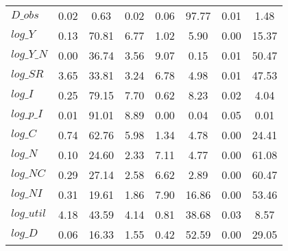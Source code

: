 \begin{center}
\begin{longtable}{lccccccc}
$D\_obs     $	 & 	        0.02	 & 	        0.63	 & 	        0.02	 & 	        0.06	 & 	       97.77	 & 	        0.01	 & 	        1.48 \\ 
$log\_Y     $	 & 	        0.13	 & 	       70.81	 & 	        6.77	 & 	        1.02	 & 	        5.90	 & 	        0.00	 & 	       15.37 \\ 
$log\_Y\_N  $	 & 	        0.00	 & 	       36.74	 & 	        3.56	 & 	        9.07	 & 	        0.15	 & 	        0.01	 & 	       50.47 \\ 
$log\_SR    $	 & 	        3.65	 & 	       33.81	 & 	        3.24	 & 	        6.78	 & 	        4.98	 & 	        0.01	 & 	       47.53 \\ 
$log\_I     $	 & 	        0.25	 & 	       79.15	 & 	        7.70	 & 	        0.62	 & 	        8.23	 & 	        0.02	 & 	        4.04 \\ 
$log\_p\_I  $	 & 	        0.01	 & 	       91.01	 & 	        8.89	 & 	        0.00	 & 	        0.04	 & 	        0.05	 & 	        0.01 \\ 
$log\_C     $	 & 	        0.74	 & 	       62.76	 & 	        5.98	 & 	        1.34	 & 	        4.78	 & 	        0.00	 & 	       24.41 \\ 
$log\_N     $	 & 	        0.10	 & 	       24.60	 & 	        2.33	 & 	        7.11	 & 	        4.77	 & 	        0.00	 & 	       61.08 \\ 
$log\_NC    $	 & 	        0.29	 & 	       27.14	 & 	        2.58	 & 	        6.62	 & 	        2.89	 & 	        0.00	 & 	       60.47 \\ 
$log\_NI    $	 & 	        0.31	 & 	       19.61	 & 	        1.86	 & 	        7.90	 & 	       16.86	 & 	        0.00	 & 	       53.46 \\ 
$log\_util  $	 & 	        4.18	 & 	       43.59	 & 	        4.14	 & 	        0.81	 & 	       38.68	 & 	        0.03	 & 	        8.57 \\ 
$log\_D     $	 & 	        0.06	 & 	       16.33	 & 	        1.55	 & 	        0.42	 & 	       52.59	 & 	        0.00	 & 	       29.05 \\ 
\end{longtable}
 \end{center}
